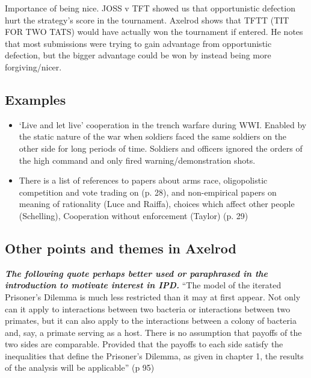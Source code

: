 Importance of being nice. JOSS v TFT showed us that opportunistic defection hurt the strategy's score in the tournament. Axelrod shows that TFTT (TIT FOR TWO TATS) would have actually won the tournament if entered. He notes that most submissions were trying to gain advantage from opportunistic defection, but the bigger advantage could be won by instead being more forgiving/nicer.


\subsection{Examples}

\begin{itemize}
\item`Live and let live' cooperation in the trench warfare during WWI. Enabled by the static nature of the war when soldiers faced the same soldiers on the other side for long periods of time. Soldiers and officers ignored the orders of the high command and only fired warning/demonstration shots.
\item There is a list of references to papers about arms race, oligopolistic competition and vote trading on (p. 28), and non-empirical papers on meaning of rationality (Luce and Raiffa), choices which affect other people (Schelling), Cooperation without enforcement (Taylor) (p. 29)

\end{itemize}


\subsection{Other points and themes in Axelrod}
\textit{\textbf{The following quote perhaps better used or paraphrased in the introduction to motivate interest in IPD.}} ``The model of the iterated Prisoner's Dilemma is much less restricted than it may at first appear. Not only can it apply to interactions between two bacteria or interactions between two primates, but it can also apply to the interactions between a colony of bacteria and, say, a primate serving as a host. There is no assumption that payoffs of the two sides are comparable. Provided that the payoffs to each side satisfy the inequalities that define the Prisoner's Dilemma, as given in chapter 1, the results of the analysis will be applicable'' (p 95)

